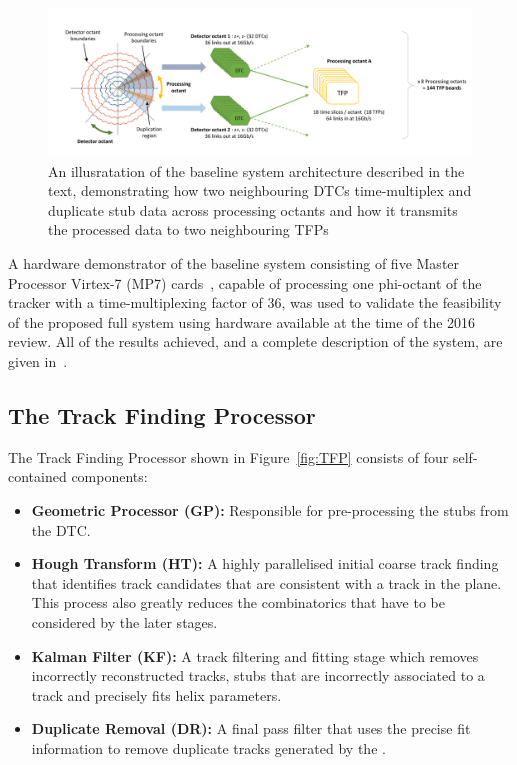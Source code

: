 \begin{figure}[h]
\centering
\includegraphics[width=1.00\textwidth]{figs/tk-upgrade/tmttarch.pdf}
\caption{An illusratation of the baseline system architecture described in the text, demonstrating how two neighbouring DTCs time-multiplex and duplicate stub data across processing octants and how it transmits the processed data to two neighbouring TFPs~\cite{TMTT_JINST}}
\label{fig:tmttarch}
\end{figure}

A hardware demonstrator of the baseline system consisting of five Master Processor Virtex-7 (MP7) cards~\cite{mp7ref}, capable of processing one phi-octant of the tracker with a time-multiplexing factor of 36, was used to validate the feasibility of the proposed full system using hardware available at the time of the 2016 review.
All of the results achieved, and a complete description of the system, are given in~\cite{TMTT_JINST}.

\subsection{The Track Finding Processor}\label{subsec:TFP}
The Track Finding Processor shown in Figure~\ref{fig:TFP} consists of four self-contained components:
\begin{itemize}
\item {\bf Geometric Processor (GP):} Responsible for pre-processing the stubs from the DTC.
\item {\bf Hough Transform (HT):} A highly parallelised initial coarse track finding that identifies track candidates that are consistent with a track in the \rphi plane. This process also greatly reduces the combinatorics that have to be considered by the later stages.
\item {\bf Kalman Filter (KF):} A track filtering and fitting stage which removes incorrectly reconstructed tracks, stubs that are incorrectly associated to a track and precisely fits helix parameters.
\item {\bf Duplicate Removal (DR):} A final pass filter that uses the precise fit information to remove duplicate tracks generated by the \HT.
\end{itemize}

